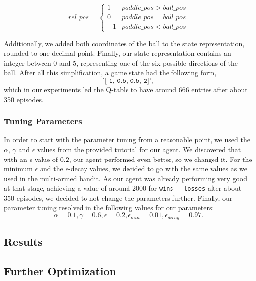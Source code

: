 \documentclass[10pt]{article}
\begin{document}
    \[\mathit{rel\_pos} = \begin{cases}
                              1 & \mathit{paddle\_pos} > \mathit{ball\_pos} \\
                              0 & \mathit{paddle\_pos} = \mathit{ball\_pos} \\
                              -1 & \mathit{paddle\_pos} < \mathit{ball\_pos}
    \end{cases}
    \]

    Additionally, we added both coordinates of the ball to the state representation, rounded to one decimal point.
    Finally, our state representation contains an integer between 0 and 5, representing one of the six possible directions of the ball.
    After all this simplification, a game state had the following form,\[\texttt{'[-1, 0.5, 0.5, 2]'},\] which in our experiments led the Q-table to have around 666 entries after about 350 episodes.

    \subsubsection{Tuning Parameters}
    In order to start with the parameter tuning from a reasonable point, we used the $\alpha$, $\gamma$ and $\epsilon$ values from the provided \href{https://www.learndatasci.com/tutorials/reinforcement-q-learning-scratch-python-openai-gym/}{tutorial} for our agent.
    We discovered that with an $\epsilon$ value of 0.2, our agent performed even better, so we changed it.
    For the minimum $\epsilon$ and the $\epsilon$-decay values, we decided to go with the same values as we used in the multi-armed bandit.
    As our agent was already performing very good at that stage, achieving a value of around 2000 for \texttt{wins - losses} after about 350 episodes, we decided to not change the parameters further.
    Finally, our parameter tuning resolved in the following values for our parameters:
    \[\alpha = 0.1, \gamma = 0.6, \epsilon = 0.2, \epsilon_\mathit{min} = 0.01, \epsilon_\mathit{decay} = 0.97.\]

    \subsection{Results}\label{subsec:pong-results}
    \subsection{Further Optimization}\label{subsec:pong-further-optimization}
\end{document}
